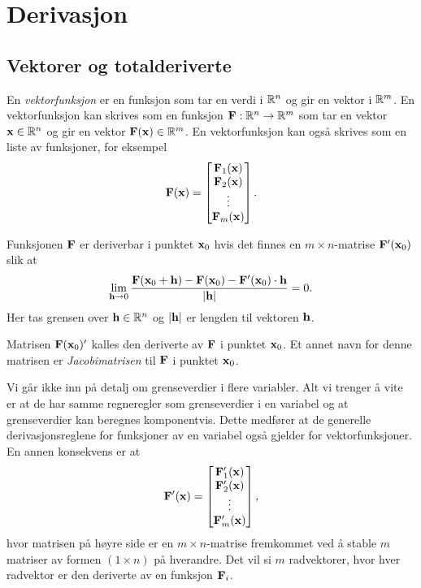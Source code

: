 \section{Derivasjon}
\subsection{Vektorer og totalderiverte}
En {\em vektorfunksjon} er en funksjon som tar en verdi i $\mathbb{R}^n$ og gir en
vektor i $\mathbb{R}^m$. En vektorfunksjon kan skrives som en funksjon
$\mathbf{F}:\mathbb{R}^n\to\mathbb{R}^m$ som tar en vektor $\mathbf{x}\in\mathbb{R}^n$ og gir en vektor
$\mathbf{F}(\mathbf{x})\in\mathbb{R}^m$. En vektorfunksjon kan også skrives som en liste av
funksjoner, for eksempel
$$\mathbf{F}(\mathbf{x}) = \begin{bmatrix} \mathbf{F}_1(\mathbf{x}) \\ \mathbf{F}_2(\mathbf{x}) \\ \vdots \\ \mathbf{F}_m(\mathbf{x}) \end{bmatrix}.$$

\begin{definisjon}
Funksjonen $\mathbf{F}$ er deriverbar i punktet $\mathbf{x}_0$ hvis det finnes en $m \times n$-matrise $\mathbf{F}'(\mathbf{x}_0)$ slik at
$$\lim_{\mathbf{h}\to 0} \frac{\mathbf{F}(\mathbf{x}_0+\mathbf{h}) - \mathbf{F}(\mathbf{x}_0) -
\mathbf{F}'(\mathbf{x}_0) \cdot \mathbf{h}}{|\mathbf{h}|} = 0.$$
Her tas grensen over $\mathbf{h} \in \mathbb{R}^n$ og $| \mathbf{h}|$ er lengden til vektoren $\mathbf{h}$.

Matrisen $\mathbf{F}(\mathbf{x}_0)'$ kalles den deriverte av $\mathbf{F}$ i punktet $\mathbf{x}_0$. Et annet
navn for denne matrisen er {\em Jacobimatrisen} til $\mathbf{F}$ i punktet $\mathbf{x}_0$.
\end{definisjon}


Vi går ikke inn på detalj om grenseverdier i flere variabler. Alt vi trenger å
vite er at de har samme regneregler som
grenseverdier i en variabel og at grenseverdier kan beregnes komponentvis.
Dette medfører at de generelle derivasjonsreglene for funksjoner av en variabel også gjelder for vektorfunksjoner.
En annen konsekvens er at 
$$\mathbf{F}'(\mathbf{x}) = \begin{bmatrix} \mathbf{F}'_1(\mathbf{x}) \\ \mathbf{F}'_2(\mathbf{x})
\\ \vdots \\ \mathbf{F}'_m(\mathbf{x}) \end{bmatrix},$$
hvor matrisen på høyre side er en $m \times n$-matrise fremkommet ved å stable
$m$ matriser av formen $(1 \times n)$ på hverandre.
Det vil si $m$ radvektorer, hvor hver radvektor er den deriverte av en funksjon $\mathbf{F}_i$.

